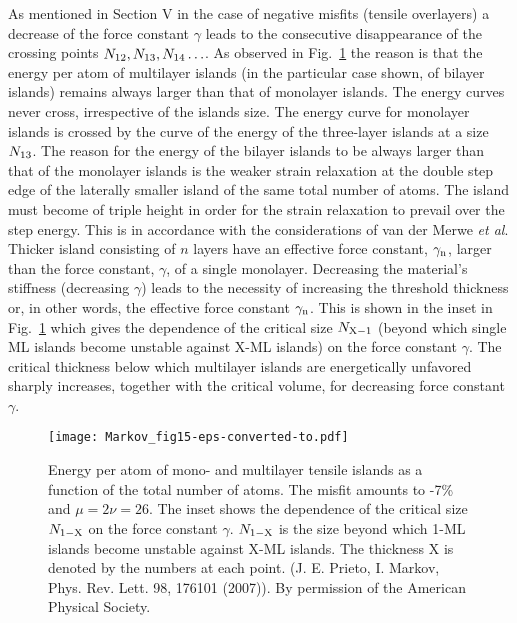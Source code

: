 \documentclass[aps,prl,showpacs,twocolumn,byrevtex,floatfix]{revtex4-1}
\begin{document}
As mentioned in Section V in the case of negative misfits (tensile overlayers)
a decrease of the force constant $\gamma$ leads to the consecutive disappearance
of the crossing points $N_{\rm 12}, N_{\rm 13}, N_{\rm 14}\hdots$. As observed
in Fig.\ \ref{monomulti} the reason is that the energy per atom of multilayer
islands (in the particular case shown, of bilayer islands) remains always larger
than that of monolayer islands.\cite{Prieto07} The energy curves never cross, 
irrespective of the islands size. The energy curve for monolayer islands is
crossed by the curve of the energy of the three-layer islands at a size $N_{\rm
13}$. The reason for the energy of the bilayer islands to be always larger than
that of the monolayer islands is the weaker strain relaxation at the double step
edge of the laterally smaller island of the same total number of atoms. The
island must become of triple height in order for the strain relaxation to
prevail over the step energy. This is in accordance with the considerations of
van der Merwe {\it et al}.\cite{Merwe86} Thicker island consisting of $n$ layers
have an effective force constant, $\gamma_{\rm n}$, larger than the force
constant, $\gamma$, of a single monolayer. Decreasing the material's stiffness
(decreasing $\gamma$) leads to the necessity of increasing the threshold
thickness or, in other words, the effective force constant $\gamma_{\rm n}$.
This is shown in the inset in Fig.\ \ref{monomulti} which gives the dependence
of the critical size $N_{\rm X-1}$ (beyond which single ML islands become
unstable against X-ML islands) on the force constant $\gamma$. The critical
thickness below which multilayer islands are energetically unfavored sharply
increases, together with the critical volume, for decreasing force constant
$\gamma$.

\begin{figure}[htb]
\texttt{[image: Markov\_fig15-eps-converted-to.pdf]}
\caption{\label{monomulti} Energy per atom of mono- and multilayer tensile
islands as a function of the total number of atoms. The misfit amounts to -7\%
and $\mu =2\nu = 26$. The inset shows the dependence of the critical size
$N_{\rm 1-X}$ on the force constant $\gamma$. $N_{\rm 1-X}$ is the size beyond
which 1-ML islands become unstable against X-ML islands. The thickness X is
denoted by the numbers at each point. (J. E. Prieto, I. Markov, Phys. Rev. Lett.
98, 176101 (2007)). By permission of the American Physical Society.}
\end{figure}
\end{document}
